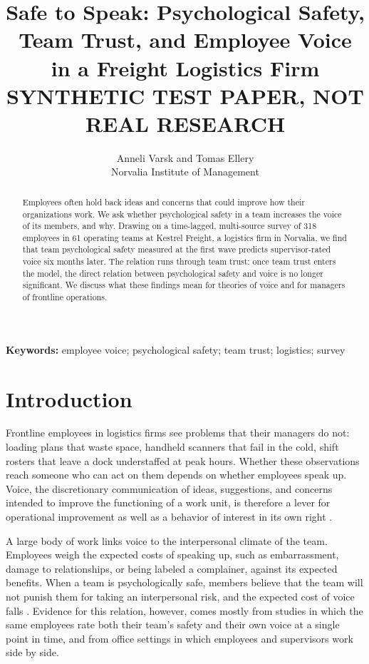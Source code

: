 \documentclass[11pt]{article}
\title{Safe to Speak: Psychological Safety, Team Trust, and Employee Voice in a Freight Logistics Firm\\[10pt]
\large\textbf{SYNTHETIC TEST PAPER, NOT REAL RESEARCH}}
\author{Anneli Varsk and Tomas Ellery\\Norvalia Institute of Management}
\date{}
\begin{document}
\maketitle

\begin{abstract}
\noindent Employees often hold back ideas and concerns that could improve how their organizations work. We ask whether psychological safety in a team increases the voice of its members, and why. Drawing on a time-lagged, multi-source survey of 318 employees in 61 operating teams at Kestrel Freight, a logistics firm in Norvalia, we find that team psychological safety measured at the first wave predicts supervisor-rated voice six months later. The relation runs through team trust: once team trust enters the model, the direct relation between psychological safety and voice is no longer significant. We discuss what these findings mean for theories of voice and for managers of frontline operations.
\end{abstract}

\noindent\textbf{Keywords:} employee voice; psychological safety; team trust; logistics; survey

\section{Introduction}

Frontline employees in logistics firms see problems that their managers do not: loading plans that waste space, handheld scanners that fail in the cold, shift rosters that leave a dock understaffed at peak hours. Whether these observations reach someone who can act on them depends on whether employees speak up. Voice, the discretionary communication of ideas, suggestions, and concerns intended to improve the functioning of a work unit, is therefore a lever for operational improvement as well as a behavior of interest in its own right \citep{randell2011}.

A large body of work links voice to the interpersonal climate of the team. Employees weigh the expected costs of speaking up, such as embarrassment, damage to relationships, or being labeled a complainer, against its expected benefits. When a team is psychologically safe, members believe that the team will not punish them for taking an interpersonal risk, and the expected cost of voice falls \citep{harlow2009}. Evidence for this relation, however, comes mostly from studies in which the same employees rate both their team's safety and their own voice at a single point in time, and from office settings in which employees and supervisors work side by side.
\end{document}

